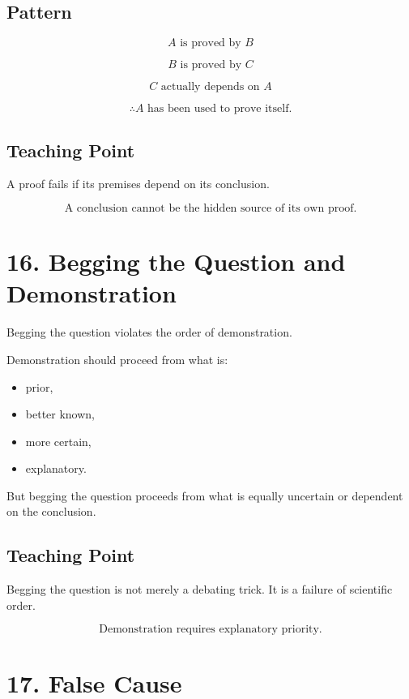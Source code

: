 \documentclass[12pt]{article}
\begin{document}
\subsection*{Pattern}

\[
A \text{ is proved by } B
\]

\[
B \text{ is proved by } C
\]

\[
C \text{ actually depends on } A
\]

\[
\therefore A \text{ has been used to prove itself.}
\]

\subsection*{Teaching Point}

A proof fails if its premises depend on its conclusion.

\[
\boxed{
\text{A conclusion cannot be the hidden source of its own proof.}
}
\]

\section*{16. Begging the Question and Demonstration}

Begging the question violates the order of demonstration.

Demonstration should proceed from what is:

\begin{itemize}[itemsep=0.25em]
    \item prior,
    \item better known,
    \item more certain,
    \item explanatory.
\end{itemize}

But begging the question proceeds from what is equally uncertain or dependent
on the conclusion.

\subsection*{Teaching Point}

Begging the question is not merely a debating trick. It is a failure of
scientific order.

\[
\boxed{
\text{Demonstration requires explanatory priority.}
}
\]

\section*{17. False Cause}
\end{document}
